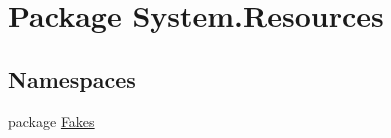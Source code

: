 \hypertarget{namespace_system_1_1_resources}{\section{Package System.\-Resources}
\label{namespace_system_1_1_resources}
}
\subsection*{Namespaces}
\begin{DoxyCompactItemize}
\item 
package \hyperlink{namespace_system_1_1_resources_1_1_fakes}{Fakes}
\end{DoxyCompactItemize}
